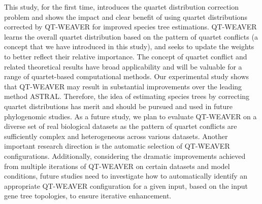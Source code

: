 \documentclass[runningheads]{llncs}
\begin{document}
This study, for the first time, introduces the quartet distribution correction problem and shows the impact and  clear benefit of using quartet distributions corrected by QT-WEAVER for improved species tree estimations. %
QT-WEAVER learns the overall quartet distribution based on the pattern of quartet conflicts (a concept that we have introduced in this study), and seeks to update the weights to better reflect their relative importance. The concept of quartet conflict and related theoretical results have broad applicability and will be valuable for a range of quartet-based computational methods. Our experimental study shows that QT-WEAVER may result in substantial improvements over the leading method ASTRAL.
Therefore, the idea of estimating species trees by correcting  quartet distributions has merit and should be pursued and used in future phylogenomic studies. %
As a future study, we plan to evaluate QT-WEAVER on a diverse set of real biological datasets as the pattern of quartet conflicts are sufficiently complex and heterogeneous across various datasets. Another important research direction is the automatic selection of QT-WEAVER configurations. %
Additionally, considering the dramatic improvements achieved from multiple iterations of QT-WEAVER on certain datasets and model conditions, future studies need to investigate how to automatically identify an appropriate QT-WEAVER configuration for a given input, based on the input gene tree topologies, to ensure iterative enhancement.
\end{document}
